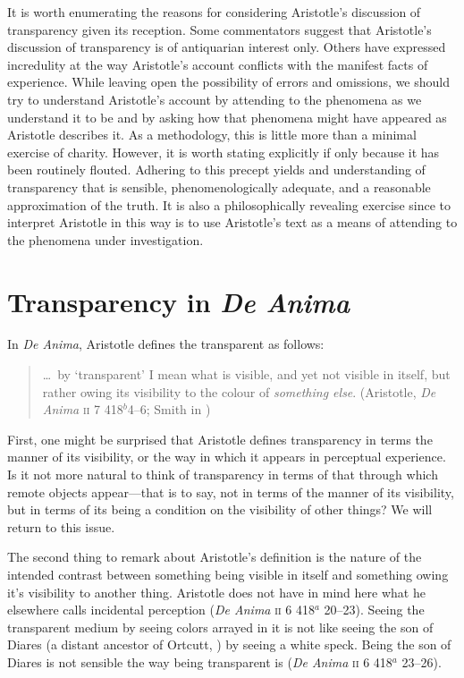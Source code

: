 It is worth enumerating the reasons for considering Aristotle's discussion of transparency given its reception. Some commentators suggest that Aristotle's discussion of transparency is of antiquarian interest only. Others have expressed incredulity at the way Aristotle's account conflicts with the manifest facts of experience. While leaving open the possibility of errors and omissions, we should try to understand Aristotle's account by attending to the phenomena as we understand it to be and by asking how that phenomena might have appeared as Aristotle describes it. As a methodology, this is little more than a minimal exercise of charity. However, it is worth stating explicitly if only because it has been routinely flouted. Adhering to this precept yields and understanding of transparency that is sensible, phenomenologically adequate, and a reasonable approximation of the truth. It is also a philosophically revealing exercise since to interpret Aristotle in this way is to use Aristotle's text as a means of attending to the phenomena under investigation.


\section{Transparency in \emph{De Anima}} %
\label{sec:transparency_in_de_anima}

In \emph{De Anima}, Aristotle defines the transparent as follows:
\begin{quote}
	\ldots\ by `transparent' I mean what is visible, and yet not visible in itself, but rather owing its visibility to the colour of \emph{something else}. (Aristotle, \emph{De Anima} \textsc{ii} 7 418\( ^{b} \)4--6; Smith in \citealt[32]{Barnes:1984uq})
\end{quote}

First, one might be surprised that Aristotle defines transparency in terms the manner of its visibility, or the way in which it appears in perceptual experience. Is it not more natural to think of transparency in terms of that through which remote objects appear---that is to say, not in terms of the manner of its visibility, but in terms of its being a condition on the visibility of other things? We will return to this issue.

The second thing to remark about Aristotle's definition is the nature of the intended contrast between something being visible in itself and something owing it's visibility to another thing. Aristotle does not have in mind here what he elsewhere calls incidental perception (\emph{De Anima} \textsc{ii} 6 418\( ^{a} \) 20--23). Seeing the transparent medium by seeing colors arrayed in it is not like seeing the son of Diares (a distant ancestor of Ortcutt, \citealt{Quine:1956qp}) by seeing a white speck. Being the son of Diares is not sensible the way being transparent is (\emph{De Anima} \textsc{ii} 6 418\( ^{a} \) 23--26).

